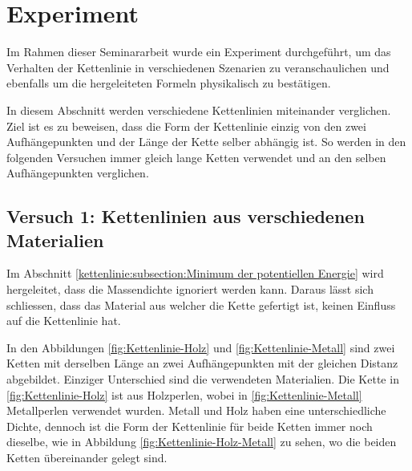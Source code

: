 %
%
%
%
\section{Experiment\label{kettenlinie:section:Experiment}}
Im Rahmen dieser Seminararbeit wurde ein Experiment durchgeführt, um das Verhalten der Kettenlinie in verschiedenen Szenarien zu veranschaulichen und ebenfalls um die hergeleiteten Formeln physikalisch zu bestätigen.

In diesem Abschnitt werden verschiedene Kettenlinien miteinander verglichen.
Ziel ist es zu beweisen, dass die Form der Kettenlinie einzig von den zwei Aufhängepunkten und der Länge der Kette selber abhängig ist.
So werden in den folgenden Versuchen immer gleich lange Ketten verwendet und an den selben Aufhängepunkten verglichen.

\subsection{Versuch 1: Kettenlinien aus verschiedenen Materialien
\label{kettenlinie:subsection:massendichte}}
Im Abschnitt \ref{kettenlinie:subsection:Minimum der potentiellen Energie} wird hergeleitet, dass die Massendichte ignoriert werden kann. Daraus lässt sich schliessen, dass das Material aus welcher die Kette gefertigt ist, keinen Einfluss auf die Kettenlinie hat.

In den Abbildungen \ref{fig:Kettenlinie-Holz} und \ref{fig:Kettenlinie-Metall} sind zwei Ketten mit derselben Länge an zwei Aufhängepunkten mit der gleichen Distanz abgebildet.
Einziger Unterschied sind die verwendeten Materialien.
Die Kette in \ref{fig:Kettenlinie-Holz} ist aus Holzperlen, wobei in \ref{fig:Kettenlinie-Metall} Metallperlen verwendet wurden.
Metall und Holz haben eine unterschiedliche Dichte, dennoch ist die Form der Kettenlinie für beide Ketten immer noch dieselbe, wie in Abbildung \ref{fig:Kettenlinie-Holz-Metall} zu sehen, wo die beiden Ketten übereinander gelegt sind.

